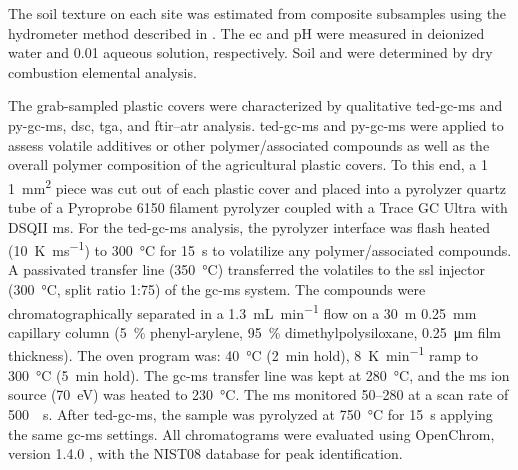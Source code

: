 The soil texture on each site was estimated from composite subsamples using the hydrometer method described in \citet{ASTMD422-63Standard2007}. The \ac{ec} and pH were measured in deionized water and \SI{0.01}{\Molar}  aqueous solution, respectively. Soil  and  were determined by dry combustion elemental analysis.

The grab-sampled plastic covers were characterized by qualitative \ac{ted-gc-ms} and \ac{py-gc-ms}, \ac{dsc}, \ac{tga}, and \ac{ftir}--\ac{atr} analysis.
\ac{ted-gc-ms} and \ac{py-gc-ms} were applied to assess volatile additives or other polymer\-/associated compounds as well as the overall polymer composition of the agricultural plastic covers. To this end, a \num{1}\,\texttimes\,\SI{1}{\square\milli\meter} piece was cut out of each plastic cover and placed into a pyrolyzer quartz tube of a Pyroprobe 6150 filament pyrolyzer coupled with a Trace GC Ultra with DSQII \ac{ms}.
For the \ac{ted-gc-ms} analysis, the pyrolyzer interface was flash heated (\SI{10}{\kelvin\per\milli\second}) to \SI{300}{\degreeCelsius} for \SI{15}{\second} to volatilize any polymer\-/associated compounds. A passivated transfer line (\SI{350}{\degreeCelsius}) transferred the volatiles to the \ac{ssl} injector (\SI{300}{\degreeCelsius}, split ratio 1:75) of the \ac{gc-ms} system.
The compounds were chromatographically separated in a \SI{1.3}{\milli\liter\per\minute}  flow on a \SI{30}{\meter}\,\texttimes\,\SI{0.25}{\milli\meter} capillary column (\SI{5}{\percent} phenyl-arylene, \SI{95}{\percent} dimethylpolysiloxane, \SI{0.25}{\micro\meter} film thickness). The oven program was: \SI{40}{\degreeCelsius} (\SI{2}{\minute} hold), \SI{8}{\kelvin\per\minute} ramp to \SI{300}{\degreeCelsius} (\SI{5}{\minute} hold). The \ac{gc-ms} transfer line was kept at \SI{280}{\degreeCelsius}, and the \ac{ms} ion source (\SI{70}{\electronvolt}) was heated to \SI{230}{\degreeCelsius}. The \ac{ms} monitored \SIrange{50}{280}{\mz} at a scan rate of \SI{500}{\per\second}.
After \ac{ted-gc-ms}, the sample was pyrolyzed at \SI{750}{\degreeCelsius} for \SI{15}{\second} applying the same \ac{gc-ms} settings. All chromatograms were evaluated using OpenChrom, version 1.4.0 \citep{WenigOpenChrom2010}, with the NIST08 database for peak identification.

